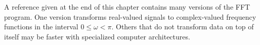 A reference given at the end of this chapter
contains many %
versions of the FFT program.
One version transforms real-valued signals to complex-valued
frequency functions in the interval $0 \le \omega < \pi$.
Others that do not transform data on top of itself
may be faster with specialized computer architectures.

\begin{comment}
\subsection{Shifted spectrum}
Subroutine \texttt{simpleft()} \vpageref{lst:simpleft}
sets things up in a convenient manner:
The frequency range runs from minus Nyquist
up to (but not including) plus Nyquist.
Thus there is no problem with the many (but not all)
user programs that have trouble with aliased frequencies.
Subroutine \texttt{ftu()} \vpageref{lst:ftu}, however has a frequency range
from zero to double the Nyquist.
Let us therefore define a friendlier ``front end'' to {\tt ftu()}
which looks more like {\tt simpleft()}.

\par
Recall that a time shift of $t_0$ can be implemented in 
the Fourier domain by multiplication by
$e^{-i\omega t_0}$.
Likewise, in the Fourier domain,
the frequency interval, 
namely, $ 0 \le \omega < 2\pi$,
can be shifted to the friendlier interval
$ -\pi \le \omega < \pi$
by a weighting function in the time domain.
That weighting function is $e^{-i\omega_0 t}$
where $\omega_0$ happens to be the Nyquist frequency,
i.e.~alternate points on the time axis are to be multiplied by $-1$.

A subroutine for this purpose is {\tt fth()}.
\progdex{fth}{FT, Hale style}
\newslide
\par
\noindent
To Fourier transform a 1024-point complex vector {\tt cx(1024)}
and then inverse transform it, we would write
\begin{verbatim}
call fth( 0, 1., 1, 1024, cx)
call fth( 1, 1., 1, 1024, cx)
\end{verbatim}
\noindent
You might wonder about the apparent redundancy of using both
the argument {\tt adj} and the argument {\tt sign}.
Having two arguments instead of one allows
us to define the {\em  forward} transform for a {\em  time} axis
with the opposite sign as
             the      forward  transform for a {\em  space} axis.
\par
The subroutine {\tt fth()} is somewhat cluttered by
the inclusion of a
frequently needed practical feature---namely,
the facility to extract vectors from a matrix,
transform the vectors, and then restore them into the matrix.
\end{comment}

